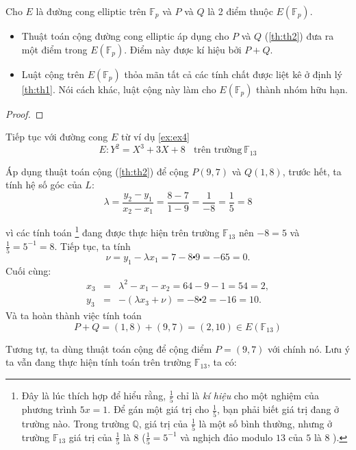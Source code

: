 \begin{theorem}
	\label{th:th3}
	Cho $E$ là đường cong elliptic trên $\mathbb{F}_p$ và $P$ và $Q$ là 2 điểm thuộc $E(\mathbb{F}_{p})$.
	\begin{itemize}
		\item Thuật toán cộng đường cong elliptic áp dụng cho $P$ và $Q$ (\ref{th:th2}) đưa ra một điểm trong $E(\mathbb{F}_{p})$.
		      Điểm này được kí hiệu bởi $P + Q$.
		\item Luật cộng trên $E(\mathbb{F}_{p})$ thỏa mãn tất cả các tính chất được liệt kê ở định lý \ref{th:th1}.
		      Nói cách khác, luật cộng này làm cho $E(\mathbb{F}_{p})$ thành nhóm hữu hạn.
	\end{itemize}
\end{theorem}

\begin{proof}

\end{proof}

\begin{example}
	\label{ex:ex5}
	Tiếp tục với đường cong $E$ từ ví dụ \ref{ex:ex4}
	$$ E: Y^2 = X^3 + 3X + 8 \ \ \ \ \text{trên trường}\  \mathbb{F}_{13} $$
\end{example}
Áp dụng thuật toán cộng (\ref{th:th2}) để cộng $P(9,7)$ và $Q(1,8)$, trước hết, ta tính hệ số góc của $L$:
$$\lambda  =\frac{y_2-y_1}{x_2-x_1} = \frac{8-7}{1-9} = \frac{1}{-8} = \frac{1}{5} = 8$$

vì các tính toán \footnote{Đây là lúc thích hợp để hiểu rằng, $\frac{1}{5}$ chỉ là \textit{kí hiệu} cho một nghiệm của phương trình $5x=1$.
	Để gán một giá trị cho $\frac{1}{5}$, bạn phải biết giá trị đang ở trường nào. Trong trường $\mathbb{Q}$, giá trị của $\frac{1}{5}$ là một số bình thường,
	nhưng ở trường $\mathbb{F}_{13}$ giá trị của $\frac{1}{5}$ là $8$ ($\frac{1}{5} = 5^{-1}$ và nghịch đảo modulo $13$ của $5$ là $8$ ).} đang được thực hiện trên trường $\mathbb{F}_{13}$ nên $-8 = 5$ và $\frac{1}{5} = 5^{-1} = 8$.
Tiếp tục, ta tính
$$\nu = y_1 - \lambda x_1 = 7 - 8 \centerdot 9 = -65 = 0.$$
Cuối cùng:
$$
	\begin{array}{rcl}
		x_3 & = & \lambda^2 - x_1 - x_2 = 64 -9 -1 = 54 = 2,         \\
		y_3 & = & -(\lambda x_3 + \nu) = -8 \centerdot 2 = -16 = 10.
	\end{array}
$$
Và ta hoàn thành việc tính toán
$$P+Q = (1,8) + (9,7) = (2,10) \in E(\mathbb{F}_{13})$$

Tương tự, ta dùng thuật toán cộng để cộng điểm $P = (9,7)$ với chính nó. Lưu ý ta vẫn đang thực hiện tính toán trên trường $\mathbb{F}_{13}$, ta có:

